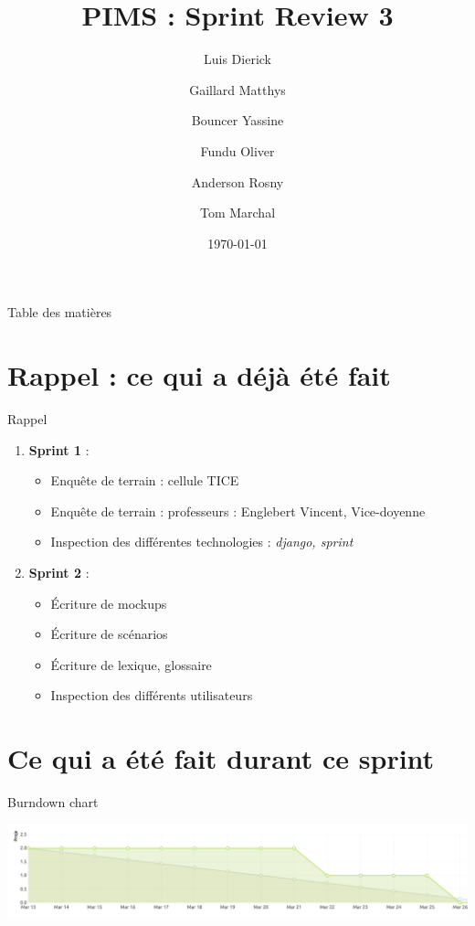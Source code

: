 \documentclass[numbering=fraction]{beamer}
\title{PIMS : Sprint Review 3}
\author[PIMS]{Luis Dierick \and Gaillard Matthys \and Bouncer Yassine \and Fundu Oliver \and Anderson Rosny \and Tom Marchal }
\institute{Université de Namur}
\date{\today}
\begin{document}
\begin{frame}[plain]{}
    \maketitle
\end{frame}

\begin{frame}{Table des matières}
    \tableofcontents
\end{frame}
\section{Rappel : ce qui a déjà été fait}
\begin{frame}{Rappel}
    \begin{enumerate}
        \item \textbf{Sprint 1} :
        \begin{itemize}
            \item Enquête de terrain : cellule TICE 
            \item Enquête de terrain : professeurs : Englebert Vincent, Vice-doyenne
            \item Inspection des différentes technologies : \textit{django, sprint}
        \end{itemize}
        \item \textbf{Sprint 2} : 
        \begin{itemize}
            \item Écriture de mockups
            \item Écriture de scénarios
            \item Écriture de lexique, glossaire
            \item Inspection des différents utilisateurs
        \end{itemize}
    \end{enumerate}
\end{frame}
\section{Ce qui a été fait durant ce sprint}

\begin{frame}{Burndown chart}
    \centering
    
    \includegraphics[width=1.1\textwidth]{burndownChart.png} 
\end{frame}
\end{document}
